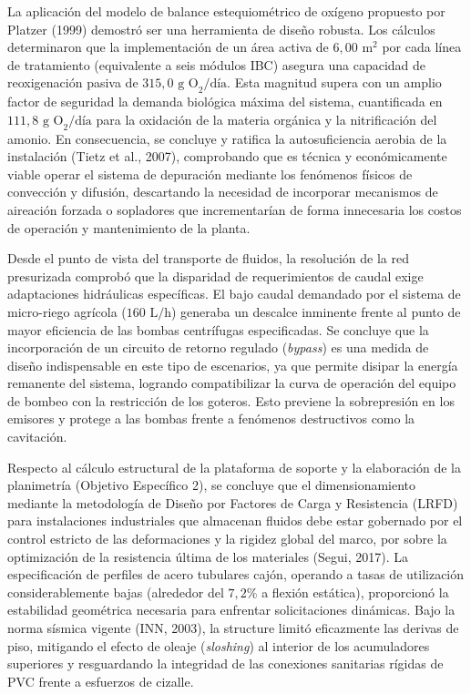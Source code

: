 \documentclass[12pt, letterpaper]{report}
\begin{document}
La aplicación del modelo de balance estequiométrico de oxígeno propuesto por Platzer (1999) demostró ser una herramienta de diseño robusta. Los cálculos determinaron que la implementación de un área activa de $6,00\text{ m}^2$ por cada línea de tratamiento (equivalente a seis módulos IBC) asegura una capacidad de reoxigenación pasiva de $315,0\text{ g O}_2/\text{día}$. Esta magnitud supera con un amplio factor de seguridad la demanda biológica máxima del sistema, cuantificada en $111,8\text{ g O}_2/\text{día}$ para la oxidación de la materia orgánica y la nitrificación del amonio. En consecuencia, se concluye y ratifica la autosuficiencia aerobia de la instalación (Tietz et al., 2007), comprobando que es técnica y económicamente viable operar el sistema de depuración mediante los fenómenos físicos de convección y difusión, descartando la necesidad de incorporar mecanismos de aireación forzada o sopladores que incrementarían de forma innecesaria los costos de operación y mantenimiento de la planta.

Desde el punto de vista del transporte de fluidos, la resolución de la red presurizada comprobó que la disparidad de requerimientos de caudal exige adaptaciones hidráulicas específicas. El bajo caudal demandado por el sistema de micro-riego agrícola ($160\text{ L/h}$) generaba un descalce inminente frente al punto de mayor eficiencia de las bombas centrífugas especificadas. Se concluye que la incorporación de un circuito de retorno regulado (\textit{bypass}) es una medida de diseño indispensable en este tipo de escenarios, ya que permite disipar la energía remanente del sistema, logrando compatibilizar la curva de operación del equipo de bombeo con la restricción de los goteros. Esto previene la sobrepresión en los emisores y protege a las bombas frente a fenómenos destructivos como la cavitación.

Respecto al cálculo estructural de la plataforma de soporte y la elaboración de la planimetría (Objetivo Específico 2), se concluye que el dimensionamiento mediante la metodología de Diseño por Factores de Carga y Resistencia (LRFD) para instalaciones industriales que almacenan fluidos debe estar gobernado por el control estricto de las deformaciones y la rigidez global del marco, por sobre la optimización de la resistencia última de los materiales (Segui, 2017). La especificación de perfiles de acero tubulares cajón, operando a tasas de utilización considerablemente bajas (alrededor del $7,2\%$ a flexión estática), proporcionó la estabilidad geométrica necesaria para enfrentar solicitaciones dinámicas. Bajo la norma sísmica vigente (INN, 2003), la structure limitó eficazmente las derivas de piso, mitigando el efecto de oleaje (\textit{sloshing}) al interior de los acumuladores superiores y resguardando la integridad de las conexiones sanitarias rígidas de PVC frente a esfuerzos de cizalle.
\end{document}
